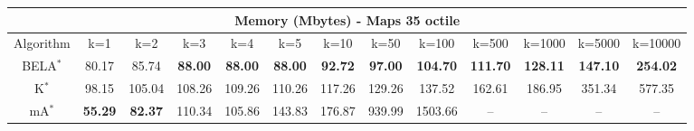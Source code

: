 \begin{tabular}{c|cccccccccccc}\toprule
\multicolumn{13}{c}{Memory (Mbytes) - Maps 35 octile}\\ \midrule
Algorithm & k=1 & k=2 & k=3 & k=4 & k=5 & k=10 & k=50 & k=100 & k=500 & k=1000 & k=5000 & k=10000 \\ \midrule
BELA$^*$ & 80.17 & 85.74 & \textbf{88.00} & \textbf{88.00} & \textbf{88.00} & \textbf{92.72} & \textbf{97.00} & \textbf{104.70} & \textbf{111.70} & \textbf{128.11} & \textbf{147.10} & \textbf{254.02} \\
K$^*$ & 98.15 & 105.04 & 108.26 & 109.26 & 110.26 & 117.26 & 129.26 & 137.52 & 162.61 & 186.95 & 351.34 & 577.35 \\
mA$^*$ & \textbf{55.29} & \textbf{82.37} & 110.34 & 105.86 & 143.83 & 176.87 & 939.99 & 1503.66 & -- & -- & -- & -- \\ \bottomrule 
\end{tabular}
